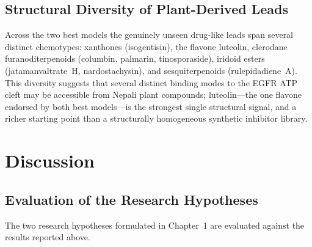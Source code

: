 \subsection{Structural Diversity of Plant-Derived Leads}

Across the two best models the genuinely unseen drug-like leads span several distinct
chemotypes: xanthones (isogentisin), the flavone luteolin, clerodane
furanoditerpenoids (columbin, palmarin, tinosporaside), iridoid esters
(jatamanvaltrate~H, nardostachysin), and sesquiterpenoids (rulepidadiene~A). This
diversity suggests that several distinct binding modes to the EGFR ATP cleft may be
accessible from Nepali plant compounds; luteolin---the one flavone endorsed by both
best models---is the strongest single structural signal, and a richer starting point
than a structurally
homogeneous synthetic inhibitor library.

\section{Discussion}
\label{sec:disc}

\subsection{Evaluation of the Research Hypotheses}

The two research hypotheses formulated in Chapter~1 are evaluated
against the results reported above.


